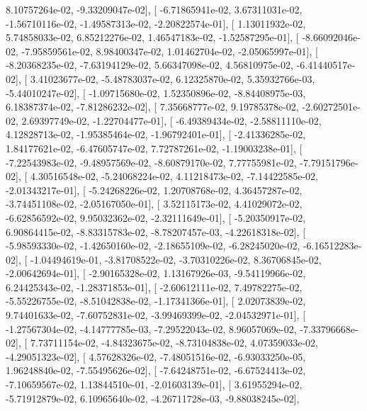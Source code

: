 \documentclass{article}
\begin{document}
          8.10757264e-02,  -9.33209047e-02],
       [ -6.71865941e-02,   3.67311031e-02,  -1.56710116e-02,
         -1.49587313e-02,  -2.20822574e-01],
       [  1.13011932e-02,   5.74858033e-02,   6.85212276e-02,
          1.46547183e-02,  -1.52587295e-01],
       [ -8.66092046e-02,  -7.95859561e-02,   8.98400347e-02,
          1.01462704e-02,  -2.05065997e-01],
       [ -8.20368235e-02,  -7.63194129e-02,   5.66347098e-02,
          4.56810975e-02,  -6.41440517e-02],
       [  3.41023677e-02,  -5.48783037e-02,   6.12325870e-02,
          5.35932766e-03,  -5.44010247e-02],
       [ -1.09715680e-02,   1.52350896e-02,  -8.84408975e-03,
          6.18387374e-02,  -7.81286232e-02],
       [  7.35668777e-02,   9.19785378e-02,  -2.60272501e-02,
          2.69397749e-02,  -1.22704477e-01],
       [ -6.49389434e-02,  -2.58811110e-02,   4.12828713e-02,
         -1.95385464e-02,  -1.96792401e-01],
       [ -2.41336285e-02,   1.84177621e-02,  -6.47605747e-02,
          7.72787261e-02,  -1.19003238e-01],
       [ -7.22543983e-02,  -9.48957569e-02,  -8.60879170e-02,
          7.77755981e-02,  -7.79151796e-02],
       [  4.30516548e-02,  -5.24068224e-02,   4.11218473e-02,
         -7.14422585e-02,  -2.01343217e-01],
       [ -5.24268226e-02,   1.20708768e-02,   4.36457287e-02,
         -3.74451108e-02,  -2.05167050e-01],
       [  3.52115173e-02,   4.41029072e-02,  -6.62856592e-02,
          9.95032362e-02,  -2.32111649e-01],
       [ -5.20350917e-02,   6.90864415e-02,  -8.83315783e-02,
         -8.78207457e-03,  -4.22618318e-02],
       [ -5.98593330e-02,  -1.42650160e-02,  -2.18655109e-02,
         -6.28245020e-02,  -6.16512283e-02],
       [ -1.04494619e-01,  -3.81708522e-02,  -3.70310226e-02,
          8.36706845e-02,  -2.00642694e-01],
       [ -2.90165328e-02,   1.13167926e-03,  -9.54119966e-02,
          6.24425343e-02,  -1.28371853e-01],
       [ -2.60612111e-02,   7.49782275e-02,  -5.55226755e-02,
         -8.51042838e-02,  -1.17341366e-01],
       [  2.02073839e-02,   9.74401633e-02,  -7.60752831e-02,
         -3.99469399e-02,  -2.04532971e-01],
       [ -1.27567304e-02,  -4.14777785e-03,  -7.29522043e-02,
          8.96057069e-02,  -7.33796668e-02],
       [  7.73711154e-02,  -4.84323675e-02,  -8.73104838e-02,
          4.07359033e-02,  -4.29051323e-02],
       [  4.57628326e-02,  -7.48051516e-02,  -6.93033250e-05,
          1.96248840e-02,  -7.55495626e-02],
       [ -7.64248751e-02,  -6.67524413e-02,  -7.10659567e-02,
          1.13844510e-01,  -2.01603139e-01],
       [  3.61955294e-02,  -5.71912879e-02,   6.10965640e-02,
         -4.26711728e-03,  -9.88038245e-02],
\end{document}
